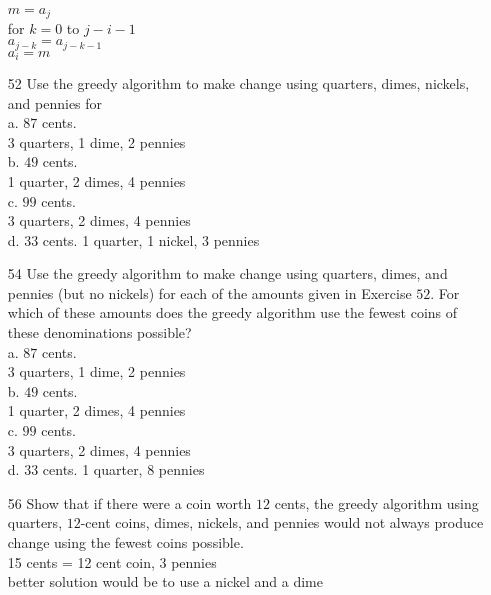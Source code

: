 \documentclass[a4paper]{article}
\newcommand\tab[1][0.5cm]{\hspace*{#1}}
\begin{document}
\begin{itemize}
    \tab\tab\tab $m = a_j$ \\
    \tab\tab\tab for $k = 0$ to $j - i - 1$ \\
    \tab\tab\tab\tab $a_{j - k} = a_{j - k - 1}$ \\
    \tab\tab\tab $a_i = m$
    \item[52] Use the greedy algorithm to make change using quarters, dimes, nickels, and pennies for \\
      a. $87$ cents. \\
      \tab 3 quarters, 1 dime, 2 pennies \\
      b. $49$ cents. \\
      \tab 1 quarter, 2 dimes, 4 pennies \\
      c. $99$ cents. \\
      \tab 3 quarters, 2 dimes, 4 pennies \\
      d. $33$ cents.
      \tab 1 quarter, 1 nickel, 3 pennies
    \item[54] Use the greedy algorithm to make change using quarters, dimes, and pennies (but no nickels) for each of the amounts given in Exercise $52$. For which of these amounts does the greedy algorithm use the fewest coins of these denominations possible? \\
      a. $87$ cents. \\
      \tab 3 quarters, 1 dime, 2 pennies \\
      b. $49$ cents. \\
      \tab 1 quarter, 2 dimes, 4 pennies \\
      c. $99$ cents. \\
      \tab 3 quarters, 2 dimes, 4 pennies \\
      d. $33$ cents.
      \tab 1 quarter, 8 pennies
    \item[56] Show that if there were a coin worth $12$ cents, the greedy algorithm using quarters, $12$-cent coins, dimes, nickels, and pennies would not always produce change using the fewest coins possible. \\
    \tab 15 cents = 12 cent coin, 3 pennies \\
    \tab better solution would be to use a nickel and a dime 
  \end{itemize}
 

  
  
\end{document}
